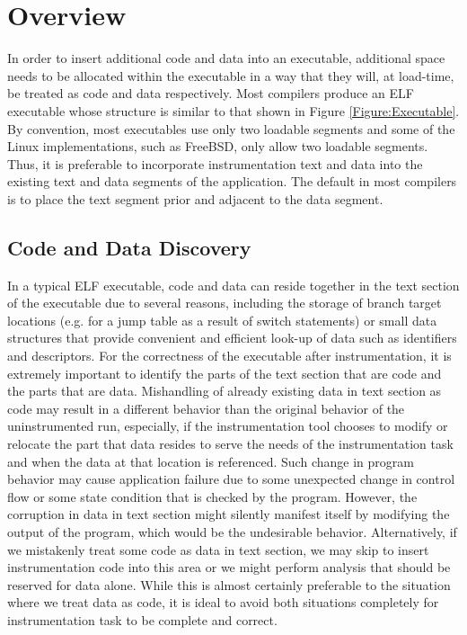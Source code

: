 \section{Overview}

In order to insert additional code
and data into an executable, additional space needs to be allocated within the executable in a way that they
will, at load-time, be treated as code and data respectively. Most compilers produce an ELF executable whose
structure is similar to that shown in Figure \ref{Figure:Executable}. By
convention, most executables use only two loadable segments and some of the Linux
implementations, such as FreeBSD, only allow two loadable segments. Thus, it is
preferable to incorporate instrumentation text and data into the
existing text and data segments of the application. The default in most
compilers is to place the text segment prior and adjacent to the data segment.

\subsection{Code and Data Discovery}
In a typical ELF executable, code and data can reside together in the text section of the executable due to several reasons, including
the storage of branch target locations (e.g. for a jump table as a result of switch statements) or small data structures 
that provide convenient and efficient look-up of data such as identifiers and descriptors. 
For the correctness of the executable after instrumentation, it is extremely important to identify  the parts of the text 
section that are code and the parts that are data. Mishandling of already existing data in text section as code 
may result in a different behavior than the original behavior of the uninstrumented run, especially, 
if the instrumentation tool chooses to modify or relocate the part that data resides 
to serve the needs of the instrumentation task and when the data at that location is referenced. 
Such change in program behavior may cause application failure due to some unexpected change in control flow 
or some state condition that is checked by the program.
However, the corruption in data in text section might silently manifest itself by modifying the output of the
program, which would be the undesirable behavior.  Alternatively, if we mistakenly treat some code as data in text section, we may skip
to insert instrumentation code into this area or we might perform analysis that should be reserved for
data alone. While this is almost certainly preferable to the situation where we treat data as code, it
is ideal to avoid both situations completely for instrumentation task to be complete and correct.


